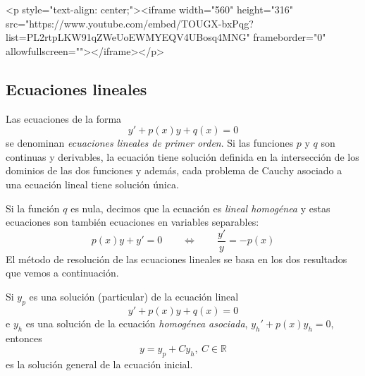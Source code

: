 \begin{rawhtml}
<p style="text-align: center;"><iframe width="560" height="316" src="https://www.youtube.com/embed/TOUGX-bxPqg?list=PL2rtpLKW91qZWeUoEWMYEQV4UBosq4MNG" frameborder="0" allowfullscreen=""></iframe></p>
\end{rawhtml}

\subsection{Ecuaciones lineales}

Las ecuaciones de la forma
\[
y'+p(x)y+q(x)=0
\]
se denominan \emph{ecuaciones lineales de primer orden}. Si las funciones $p$ y $q$ son continuas y derivables, la ecuación tiene solución definida en la intersección de los dominios de las dos funciones y además, cada problema de Cauchy asociado a una ecuación lineal tiene solución única.

Si la función $q$ es nula, decimos que la ecuación es \emph{lineal homogénea} y estas ecuaciones son también ecuaciones en variables separables:
%
\[
p(x)y+y' =0\qquad\Longleftrightarrow\qquad \frac{y'}{y}  =-p(x)
\]
%
El método de resolución de las ecuaciones lineales se basa en los dos resultados que vemos a continuación.
%
\begin{teorema}
Si $y_p$ es una solución (particular) de la ecuación lineal
\begin{equation}\label{eq:lineal}
y'+p(x)y+q(x)=0
\end{equation}
e $y_h$ es una solución de la ecuación \emph{homogénea asociada}, $y_h'+p(x)y_h=0$,
entonces
\[
y = y_p + C y_h,\ C\in\mathbb{R}
\]
es la solución general de la ecuación inicial.
\end{teorema}

